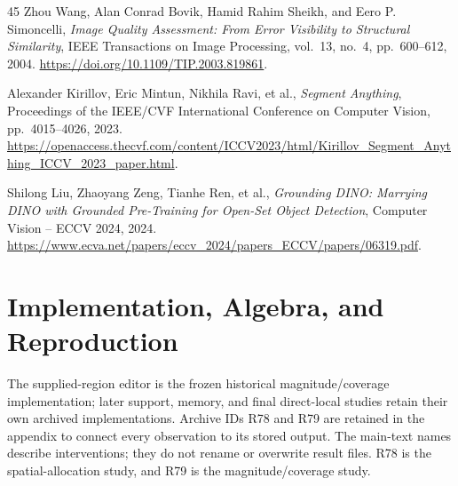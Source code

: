 \documentclass[conference]{IEEEtran}
\begin{document}
\begin{thebibliography}{45}
Zhou Wang, Alan Conrad Bovik, Hamid Rahim Sheikh, and Eero P. Simoncelli,
\textit{Image Quality Assessment: From Error Visibility to Structural Similarity},
IEEE Transactions on Image Processing, vol.~13, no.~4, pp.~600--612, 2004.
\url{https://doi.org/10.1109/TIP.2003.819861}.

Alexander Kirillov, Eric Mintun, Nikhila Ravi, et al.,
\textit{Segment Anything},
Proceedings of the IEEE/CVF International Conference on Computer Vision, pp.~4015--4026, 2023.
\url{https://openaccess.thecvf.com/content/ICCV2023/html/Kirillov_Segment_Anything_ICCV_2023_paper.html}.

Shilong Liu, Zhaoyang Zeng, Tianhe Ren, et al.,
\textit{Grounding DINO: Marrying DINO with Grounded Pre-Training for Open-Set Object Detection},
Computer Vision -- ECCV 2024, 2024.
\url{https://www.ecva.net/papers/eccv_2024/papers_ECCV/papers/06319.pdf}.

\end{thebibliography}

\clearpage
\onecolumn
\appendices


\section{Implementation, Algebra, and Reproduction}
\label{sec:implementation}
The supplied-region editor is the frozen historical magnitude/coverage implementation; later support, memory, and final direct-local studies retain their own archived implementations. Archive IDs R78 and R79 are retained in the appendix to connect every observation to its stored output. The main-text names describe interventions; they do not rename or overwrite result files. R78 is the spatial-allocation study, and R79 is the magnitude/coverage study.
\end{document}
